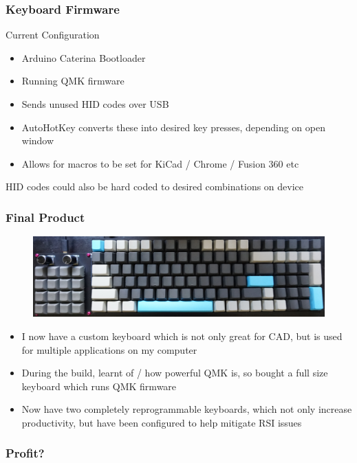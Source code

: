 \documentclass[t]{beamer}
\begin{document}
\begin{frame}
\frametitle{Keyboard Firmware}
Current Configuration
\begin{itemize}
	\item Arduino Caterina Bootloader
	\item Running QMK firmware
	\item Sends unused HID codes over USB
	\item AutoHotKey converts these into desired key presses, depending on open window
	\item Allows for macros to be set for KiCad / Chrome / Fusion 360 etc
\end{itemize}
HID codes could also be hard coded to desired combinations on device
\end{frame}
\begin{frame}
\frametitle{Final Product}
\begin{figure}
	\centering
	\includegraphics[width=\linewidth]{keyboards.jpg}
\end{figure}
\begin{itemize}
	\item I now have a custom keyboard which is not only great for CAD, but is used for multiple applications on my computer
	\item During the build, learnt of / how powerful QMK is, so bought a full size keyboard which runs QMK firmware
	\item Now have two completely reprogrammable keyboards, which not only increase productivity, but have been configured to help mitigate RSI issues 
\end{itemize}
\end{frame}
\begin{frame}
\frametitle{Profit?}
\end{frame}
\end{document}
